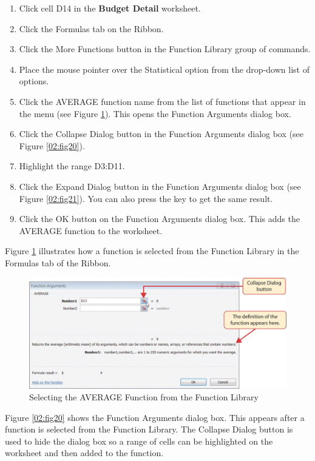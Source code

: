 \begin{enumerate}
	\item Click cell \textsf{D14} in the \textbf{Budget Detail} worksheet.
	\item Click the Formulas tab on the Ribbon.
	\item Click the More Functions button in the Function Library group of commands.
	\item Place the mouse pointer over the Statistical option from the drop-down list of options.
	\item Click the AVERAGE function name from the list of functions that appear in the menu (see Figure \ref{02:fig19}). This opens the Function Arguments dialog box.
	\item Click the Collapse Dialog button in the Function Arguments dialog box (see Figure \ref{02:fig20}).
	\item Highlight the range \textsf{D3:D11}.
	\item Click the Expand Dialog button in the Function Arguments dialog box (see Figure \ref{02:fig21}). You can also press the  key to get the same result.
	\item Click the OK button on the Function Arguments dialog box. This adds the AVERAGE function to the worksheet.
\end{enumerate}

Figure \ref{02:fig19} illustrates how a function is selected from the Function Library in the Formulas tab of the Ribbon.

\begin{figure}[H]
	\centering
	\includegraphics[width=\maxwidth{.95\linewidth}]{gfx/ch02_fig19}
	\caption{Selecting the AVERAGE Function from the Function Library}
	\label{02:fig19}
\end{figure}

Figure \ref{02:fig20} shows the Function Arguments dialog box. This appears after a function is selected from the Function Library. The Collapse Dialog button is used to hide the dialog box so a range of cells can be highlighted on the worksheet and then added to the function.

